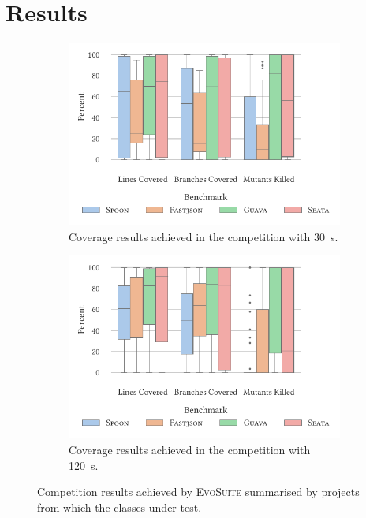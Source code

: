 \documentclass[sigconf]{acmart}
\newcommand{\EVOSUITE}{\textsc{EvoSuite}\xspace}
\begin{document}
\section{Results}


\begin{figure}
  \centering
  \begin{subfigure}{0.9\columnwidth}
    \includegraphics[width=\linewidth]{data/CoverageByBenchmark30.pdf}
    \caption{Coverage results achieved in the competition with \SI{30}{\second}.}
    \label{fig:results30}
  \end{subfigure}
  \hfill
  \begin{subfigure}{0.9\columnwidth}
    \includegraphics[width=\linewidth]{data/CoverageByBenchmark120.pdf}
    \caption{Coverage results achieved in the competition with \SI{120}{\second}.}
    \label{fig:results120}
  \end{subfigure}
  
  \caption{Competition results achieved by \EVOSUITE summarised by projects from which the classes under test.}
  \label{fig:figures}
\end{figure}
\end{document}

